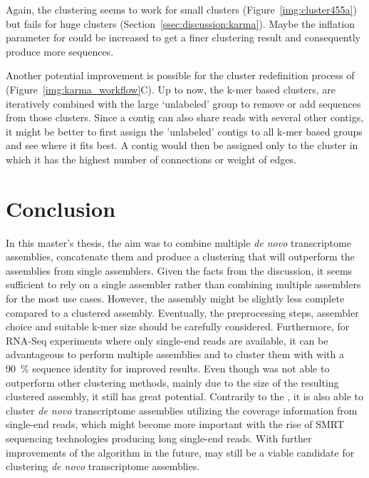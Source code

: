 \documentclass[12pt,a4paper,english]{article}
\begin{document}
	Again, the \mcl clustering seems to work for small clusters (Figure~\ref{img:cluster455a}) but fails for huge clusters (Section~\ref{ssec:discussion:karma}). Maybe the inflation parameter for \mcl could be increased to get a finer clustering result and consequently produce more sequences.
	
	Another potential improvement is possible for the cluster redefinition process of \karma (Figure~\ref{img:karma_workflow}C). Up to now, the k-mer based clusters, are iteratively combined with the large `unlabeled' group to remove or add sequences from those clusters. 
	Since a contig can also share reads with several other contigs, it might be better to first assign the 'unlabeled' contigs to all k-mer based groups and see where it fits best. A contig would then be assigned only to the cluster in which it has the highest number of connections or weight of edges.
	\newpage
	\section{Conclusion}
        In this master's thesis, the aim was to combine multiple \textit{de novo} transcriptome assemblies, concatenate them and produce a clustering that will outperform the assemblies from single assemblers.
		Given the facts from the discussion, it seems sufficient to rely on a single assembler rather than combining multiple assemblers for the most use cases. 
		However, the assembly might be slightly less complete compared to a clustered assembly.
		Eventually, the preprocessing steps, assembler choice and suitable k-mer size should be carefully considered.
		Furthermore, for RNA-Seq experiments where only single-end reads are available, it can be advantageous to perform multiple assemblies and to cluster them with \cdhit with a 90~\% sequence identity for improved results.
		Even though \karma was not able to outperform other clustering methods, mainly due to the size of the resulting clustered assembly, it still has great potential. 
		Contrarily to the \orp, it is also able to cluster \textit{de novo} transcriptome assemblies utilizing the coverage information from single-end reads, which might become more important with the rise of SMRT sequencing technologies producing long single-end reads.
		With further improvements of the algorithm in the future, \karma may still be a viable candidate for clustering \textit{de novo} transcriptome assemblies.
			
	
	

\newpage
\pagestyle{fancy}
\end{document}
